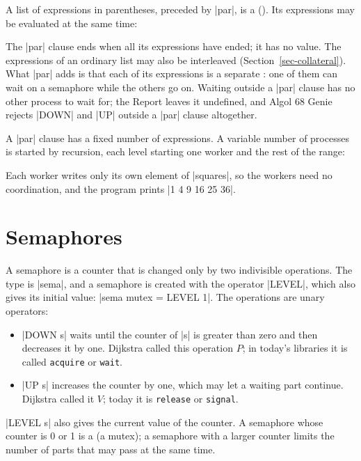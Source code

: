 A list of expressions in parentheses, preceded by \code|par|, is a
 (). Its expressions may be
evaluated at the same time:


The \code|par| clause ends when all its expressions have ended; it has no
value. The expressions of an ordinary list may also be interleaved
(Section~\ref{sec-collateral}). What \code|par| adds is that each of its
expressions is a separate : one of them can wait on a
semaphore while the others go on. Waiting outside a \code|par| clause has
no other process to wait for; the Report leaves it undefined, and Algol
68 Genie rejects \code|DOWN| and \code|UP| outside a \code|par| clause
altogether.

A \code|par| clause has a fixed number of expressions. A variable number
of processes is started by recursion, each level starting one worker and
the rest of the range:


\noindent Each worker writes only its own element of \code|squares|, so
the workers need no coordination, and the program prints
\code|1 4 9 16 25 36|.

\section{Semaphores}\label{sec-sema}

A semaphore is a counter that is changed only by two indivisible
operations. The type is \code|sema|, and a semaphore is created with the
operator \code|LEVEL|, which also gives its initial value:
\code|sema mutex = LEVEL 1|. The operations are unary operators:

\begin{itemize}
\item \code|DOWN s| waits until the counter of \code|s| is greater than
  zero and then decreases it by one. Dijkstra called this operation $P$;
  in today's libraries it is called \texttt{acquire} or \texttt{wait}.
\item \code|UP s| increases the counter by one, which may let a waiting
  part continue. Dijkstra called it $V$; today it is \texttt{release} or
  \texttt{signal}.
\end{itemize}

\code|LEVEL s| also gives the current value of the counter. A semaphore
whose counter is 0 or 1 is a  (a mutex); a semaphore with a
larger counter limits the number of parts that may pass at the same
time.

